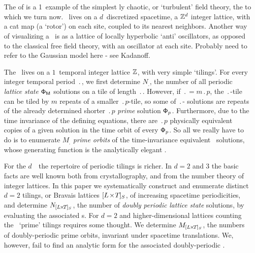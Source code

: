 
\section{\catLatt} %
\label{s:catlatt}


The \emph{\templatt} of   is a 1\dmn\ example of the simplest
{\spt}ly chaotic, or `turbulent' field theory, the {\em \catlatt} to
which we turn now. \catLatt\ lives on a  $d$\dmn\ discretized spacetime,
a {\spt} $\mathbb{Z}^d$ integer lattice, with a cat map (a `rotor') on
each site, coupled to its nearest neighbors. Another way of visualizing a
\catlatt\ is as a lattice of locally hyperbolic `anti' oscillators, as
opposed to the classical free field theory, with an oscillator at each
site.
         {
Probably need to refer to the Gaussian model here - see Kadanoff.
        }

The \templatt\ lives on a $1$\dmn\ temporal integer lattice $\mathbb{Z}$,
with very  simple `tilings'. For every integer temporal period
$\period{}$, we first determine $N_\period{}$, the number of all periodic
\emph{lattice state} ${\mathsf{\Phi}}_{\mathsf{M}}$ solutions on a tile of length
$\period{}$. However, if $\period{}=m\period{p}$, the $\period{}$-tile
can be tiled by $m$ repeats of a smaller  $\period{p}$-tile, so {some} of
$\period{}$-{\po} {solutions} are repeats of the already determined
shorter $\period{p}$ \emph{prime} solution  $\mathsf{\Phi}_p$. Furthermore, due to
the time invariance of the defining equations, there are $\period{p}$
physically equivalent copies of a given solution in the time orbit of
every $\mathsf{\Phi}_p$. So all we really have to do is to enumerate $M_\period{}$
{\em prime orbits} of the time-invariance equivalent \po\ solutions,
whose generating function is the analytically elegant {\tzeta}.

For the $d$\dmn\ \catlatt\ the repertoire of periodic tilings is richer.
In $d=2$ and $3$ the basic facts are well known both from
crystallography, and from the number theory of integer lattices. In this
paper we systematically construct and enumerate distinct $d=2$ tilings,
or Bravais lattices ${[{L_{}}\!\times\!{T_{}}]_{S_{}}}$, of increasing spacetime periodicities,
and determine $N_{{[{L_{}}\!\times\!{T_{}}]_{S_{}}}}$, the number of \emph{doubly periodic
lattice state} solutions, by evaluating the associated {\HillDet}s.
For $d=2$ and higher-dimensional lattices
counting the \spt\ `prime' tilings requires some thought. We
determine $M_{{[{L_{}}\!\times\!{T_{}}]_{S_{}}}}$, the numbers of
doubly-periodic prime orbits, invariant under spacetime translations.
We, however, fail to find an analytic form for the associated
doubly-periodic {\tzeta}.

